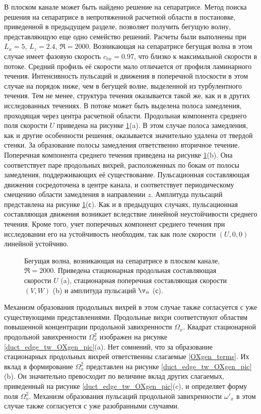 В плоском канале может быть найдено решение на сепаратрисе. Метод поиска решения на сепаратрисе в непротяженной расчетной области в постановке, приведенной в предыдущем разделе, позволяет получить бегущую волну, представляющую еще одно семейство решений. Расчеты были выполнены при $L_x = 5$, $L_z = 2.4$, $\Re = 2000$. Возникающая на сепаратрисе бегущая волна в этом случае имеет фазовую скорость $c_{tw} = 0.97$, что близко к максимальной скорости в потоке. Средний профиль её скорости мало отличается от профиля ламинарного течения. Интенсивность пульсаций и движения в поперечной плоскости в этом случае на порядок ниже, чем в бегущей волне, выделенной из турбулентного течения. Тем не менее, структура течения оказывается такой же, как и в других исследованных течениях. В потоке может быть выделена полоса замедления, проходящая через центра расчетной области. Продольная компонента среднего поля скорости $U$ приведена на рисунке \ref{duct_edge_tw_means_pic}(a). В этом случае полоса замедления, как и другие особенности решения, оказывается значительно удалена от твердой стенки. За образование полосы замедления ответственно вторичное течение. Поперечная компонента среднего течения приведена на рисунке \ref{duct_edge_tw_means_pic}(b). Она соответствует паре продольных вихрей, расположенных по бокам от полосы замедления, поддерживающих её существование. Пульсационная составляющая движения сосредоточена в центре канала, и соответствует периодическому смещению области замедления в направлении $z$. Амплитуда пульсаций представлена на рисунке \ref{duct_edge_tw_means_pic}(с). Как и в предыдущих случаях, пульсационная составляющая движения возникает вследствие линейной неустойчивости среднего течения. Кроме того, учет поперечных компонент среднего течения при исследовании его на устойчивость необходим, так как поле скорости $(U,0,0)$ линейной устойчиво. 


\begin{figure}
\caption{Бегущая волна, возникающая на сепаратрисе в плоском канале, $\Re = 2000$. Приведена стационарная продольная составляющая скорости $U$ (a), стационарная поперечная составляющая скорости $(V,W)$ (b) и амплитуда пульсаций $\v_n$ (с).} 
\label{duct_edge_tw_means_pic}
\end{figure}

Механизм образования продольных вихрей в этом случае также согласуется с уже существующими представлениями. Продольные вихри соответствуют областям повышенной концентрации продольной завихренности $\Omega_x$. Квадрат стационарной продольной завихренности $\Omega_x^2$ изображен на рисунке \ref{duct_edge_tw_OXgen_pic}(a). Нет сомнений, что за образование стационарных продольных вихрей ответственны слагаемые \eqref{OXgen_terms}. Их вклад в формирование $\Omega_x^2$ представлен на рисунке \ref{duct_edge_tw_OXgen_pic}(b). Он значительно превосходит по величине вклад других слагаемых, приведенный на рисунке \ref{duct_edge_tw_OXgen_pic}(c), и определяет форму поля $\Omega_x^2$. Механизм образования пульсаций продольной завихренности $\omega'_x$ в этом случае также согласуется с уже разобранными случаями. 

